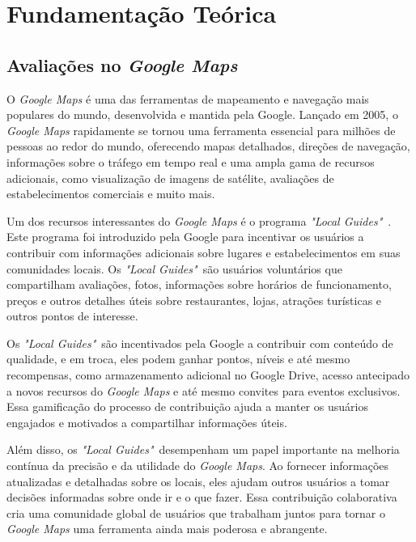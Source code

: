 \chapter{Fundamentação Teórica}
\label{cap:fund_teorica}


\section{Avaliações no \textit{Google Maps}}
\label{cap:fund_teorica:sec:google_maps}

O \textit{Google Maps} \cite{wiki:googlemaps2023} é uma das ferramentas de mapeamento e navegação mais populares do mundo, desenvolvida e mantida pela Google. Lançado em 2005, o \textit{Google Maps} rapidamente se tornou uma ferramenta essencial para milhões de pessoas ao redor do mundo, oferecendo mapas detalhados, direções de navegação, informações sobre o tráfego em tempo real e uma ampla gama de recursos adicionais, como visualização de imagens de satélite, avaliações de estabelecimentos comerciais e muito mais.

Um dos recursos interessantes do \textit{Google Maps} é o programa \textit{"Local Guides"}~\cite{google2022localguides}. Este programa foi introduzido pela Google para incentivar os usuários a contribuir com informações adicionais sobre lugares e estabelecimentos em suas comunidades locais. Os \textit{"Local Guides"}~são usuários voluntários que compartilham avaliações, fotos, informações sobre horários de funcionamento, preços e outros detalhes úteis sobre restaurantes, lojas, atrações turísticas e outros pontos de interesse.

Os \textit{"Local Guides"}~são incentivados pela Google a contribuir com conteúdo de qualidade, e em troca, eles podem ganhar pontos, níveis e até mesmo recompensas, como armazenamento adicional no Google Drive, acesso antecipado a novos recursos do \textit{Google Maps} e até mesmo convites para eventos exclusivos. Essa gamificação do processo de contribuição ajuda a manter os usuários engajados e motivados a compartilhar informações úteis.

Além disso, os \textit{"Local Guides"}~desempenham um papel importante na melhoria contínua da precisão e da utilidade do \textit{Google Maps}. Ao fornecer informações atualizadas e detalhadas sobre os locais, eles ajudam outros usuários a tomar decisões informadas sobre onde ir e o que fazer. Essa contribuição colaborativa cria uma comunidade global de usuários que trabalham juntos para tornar o \textit{Google Maps} uma ferramenta ainda mais poderosa e abrangente.

